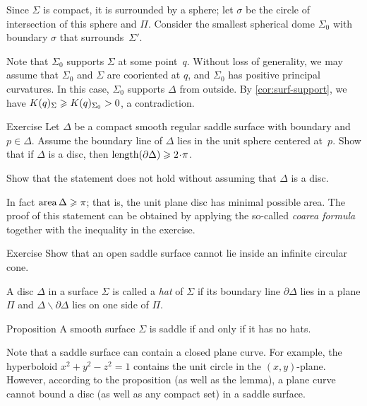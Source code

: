 Since $\Sigma$ is compact, it is surrounded by a sphere;
let $\sigma$ be the circle of intersection of this sphere and $\Pi$.
Consider the smallest spherical dome $\Sigma_0$ with boundary $\sigma$ that surrounds~$\Sigma'$.

Note that $\Sigma_0$ supports $\Sigma$ at some point~$q$.
Without loss of generality, we may assume that $\Sigma_0$ and $\Sigma$ are cooriented at $q$, and $\Sigma_0$ has positive principal curvatures.
In this case, $\Sigma_0$ supports $\Delta$ from outside.
By \ref{cor:surf-support}, we have $K(q)_\Sigma\z\ge K(q)_{\Sigma_0}>0$, a contradiction.
\qeds

\begin{thm}{Exercise}\label{ex:length-of-bry}
Let $\Delta$ be a compact smooth regular saddle surface with boundary and $p\in \Delta$.
Assume the boundary line of $\Delta$ lies in the unit sphere centered at~$p$.
Show that if $\Delta$ is a disc, then $\length(\partial\Delta)\ge 2\cdot\pi$.

Show that the statement does not hold without assuming that $\Delta$ is a disc.
\end{thm}

 In fact $\mathop{\rm area}\nolimits \Delta\geqslant \pi$;
that is, the unit plane disc has minimal possible area.
The proof of this statement can be obtained by applying the so-called \emph{coarea formula} together with the inequality in the exercise. 

\begin{thm}{Exercise}\label{ex:circular-cone-saddle}
Show that an open saddle surface
cannot lie inside an infinite circular cone. 
\end{thm}

A disc $\Delta$ in a surface $\Sigma$ is called a \emph{hat} of $\Sigma$
if its boundary line $\partial\Delta$ lies in a plane $\Pi$ and $\Delta \backslash \partial \Delta$ lies on one side of $\Pi$.

\begin{thm}{Proposition}\label{prop:hat}
A smooth surface $\Sigma$ is saddle if and only if it has no hats.
\end{thm}

Note that a saddle surface can contain a closed plane curve.
For example, the hyperboloid $x^2+y^2-z^2=1$ contains the unit circle in the $(x,y)$-plane.
However, according to the proposition (as well as the lemma), a plane curve cannot bound a disc (as well as any compact set) in a saddle surface.

